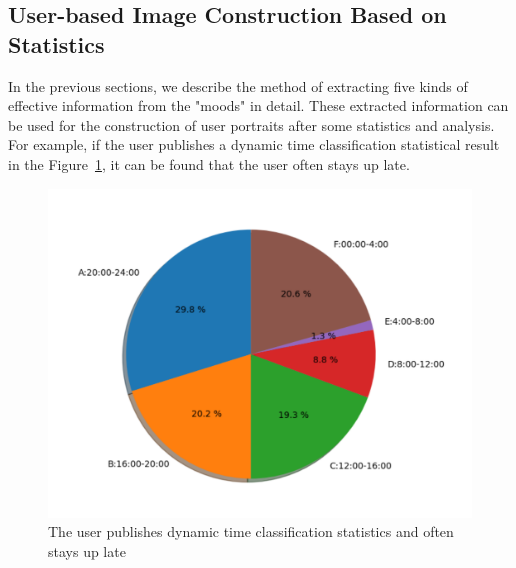 \documentclass[10pt,twocolumn,letterpaper]{article}
\begin{document}
\subsection{User-based Image Construction Based on Statistics}
    In the previous sections, we describe the method of extracting five kinds of effective information from the "moods" in detail.
    These extracted information can be used for the construction of user portraits after some statistics and analysis.
    For example, if the user publishes a dynamic time classification statistical result in the Figure~\ref{fig:411}, it can be found that the user often stays up late.
    \begin{figure}[t]
    \begin{center}
    \includegraphics[width=\linewidth]{411}
    \end{center}
    \vspace{-0.5cm}
       \caption{The user publishes dynamic time classification statistics and often stays up late}
       \label{fig:411}
    \end{figure}
\end{document}
